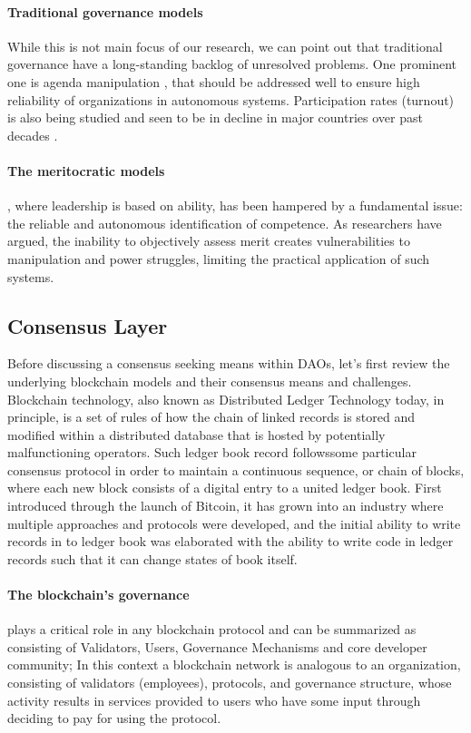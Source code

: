 \documentclass{article}
\begin{document}
\begin{CJK}{UTF8}{gbsn}
\begin{multicols}{2}
        \paragraph{Traditional governance models} While this is not main focus of our research, we can point out that traditional governance have a long-standing backlog of unresolved problems. One prominent one is agenda manipulation \cite{McKelvey1976}, that should be addressed well to ensure high reliability of organizations in autonomous systems. Participation rates (turnout) is also being studied and seen to be in decline in major countries over past decades \cite{Lawrence23}\cite{Filip24}.
        \paragraph{The meritocratic models}, where leadership is based on ability, has been hampered by a fundamental issue: the reliable and autonomous identification of competence. As researchers have argued\cite{Arrow2000}, the inability to objectively assess merit creates vulnerabilities to manipulation and power struggles, limiting the practical application of such systems.


        \subsection{Consensus Layer}
        Before discussing a consensus seeking means within DAOs, let's first review the underlying blockchain models and their consensus means and challenges. Blockchain technology, also known as Distributed Ledger Technology today, in principle, is a set of rules of how the chain of linked records is stored and modified within a distributed database that is hosted by potentially malfunctioning operators.
        Such ledger book record followssome particular consensus protocol in order to maintain a continuous sequence, or chain of blocks\cite{Merlinda2019}, where each new block consists of a digital entry to a united ledger book. First introduced through the launch of Bitcoin\cite{Satoshi}, it has grown into an industry where multiple approaches and protocols were developed, and the initial ability to write records in to ledger book was elaborated with the ability to write code in ledger records such that it can change states of book itself.
         \paragraph{The blockchain's governance} plays a critical role in any blockchain protocol and can be summarized as consisting of Validators, Users, Governance Mechanisms and core developer community; In this context a blockchain network is analogous to an organization, consisting of validators (employees), protocols, and governance structure, whose activity results in services provided to users who have some input through deciding to pay for using the protocol.


\end{multicols}
\end{CJK}
\end{document}
